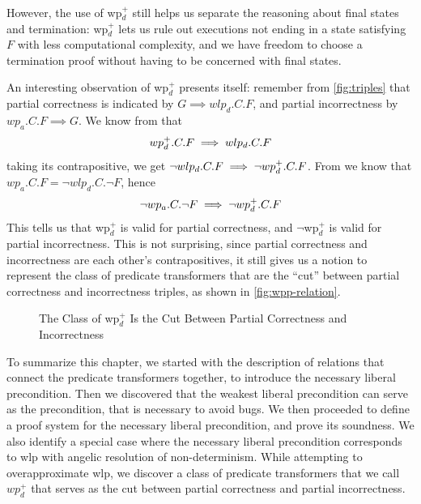 However, the use of wp$_d^+$ still helps us separate the reasoning about final states and termination: wp$_d^+$ lets us rule out executions not ending in a state satisfying $F$ with less computational complexity, and we have freedom to choose a termination proof without having to be concerned with final states. 

An interesting observation of wp$_d^+$ presents itself: remember from \autoref{fig:triples} that partial correctness is indicated by $G\implies wlp_d.C.F$, and partial incorrectness by $wp_a.C.F\implies G$. 
We know from  that $$wp_d^+.C.F\implies wlp_d.C.F$$ taking its contrapositive, we get $\neg wlp_d.C.F\implies \neg wp_d^+.C.F$. 
From  we know that $wp_a.C.F = \neg wlp_d.C.\neg F$, hence $$\neg wp_a.C.\neg F\implies \neg wp_d^+.C.F$$
This tells us that wp$_d^+$ is valid for partial correctness, and $\neg$wp$_d^+$ is valid for partial incorrectness. 
This is not surprising, since partial correctness and incorrectness are each other's contrapositives, it still gives us a notion to represent the class of predicate transformers that are the ``cut'' between partial correctness and incorrectness triples, as shown in \autoref{fig:wpp-relation}. 
\begin{figure}[ht]
	\centering
	
	\caption{The Class of wp$_d^+$ Is the Cut Between Partial Correctness and Incorrectness}
	\label{fig:wpp-relation}
\end{figure}

\medskip
To summarize this chapter, we started with the description of relations that connect the predicate transformers together, to introduce the necessary liberal precondition. 
Then we discovered that the weakest liberal precondition can serve as the precondition, that is necessary to avoid bugs. 
We then proceeded to define a proof system for the necessary liberal precondition, and prove its soundness. 
We also identify a special case where the necessary liberal precondition corresponds to wlp with angelic resolution of non-determinism. 
While attempting to overapproximate wlp, we discover a class of predicate transformers that we call $wp_d^+$ that serves as the cut between partial correctness and partial incorrectness. 



